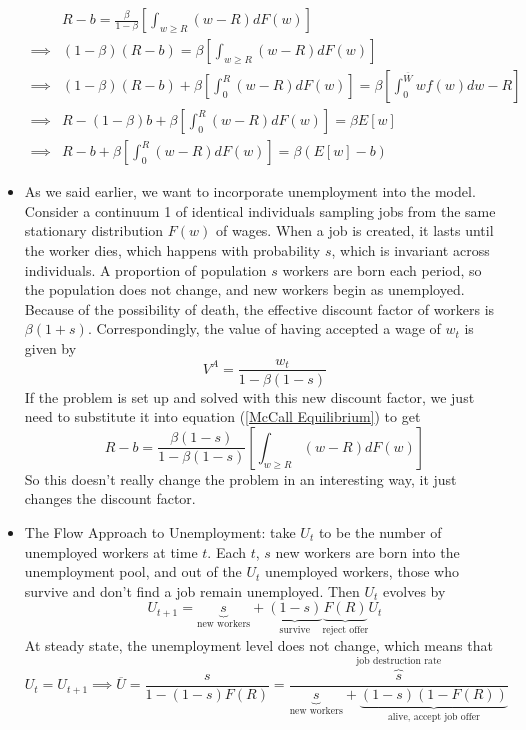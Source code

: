 \documentclass[12pt]{article}
\begin{document}
\begin{itemize}
\begin{equation}
        \begin{split}
        &R-b = \frac{\beta}{1-\beta}\left[\int_{w\geq R}(w-R)dF(w)\right] \\
        \implies &(1-\beta)(R-b) = \beta \left[\int_{w\geq R}(w-R)dF(w)\right] \\
        \implies &(1-\beta)(R-b) +\beta\left[\int_0^R(w-R)dF(w)\right] = \beta\left[ \int_0^{\overline{W}}wf(w)dw - R\right] \\
        \implies &R - (1-\beta)b +\beta\left[\int_0^R(w-R)dF(w)\right] = \beta E[w] \\
        \implies &R - b +\beta\left[\int_0^R(w-R)dF(w)\right] = \beta \left(E[w] - b\right)
    \end{split}
    \end{equation}
    \item As we said earlier, we want to incorporate unemployment into the model. Consider a continuum 1 of identical individuals sampling jobs from the same stationary distribution $F(w)$ of wages. When a job is created, it lasts until the worker dies, which happens with probability $s$, which is invariant across individuals. A proportion of population $s$ workers are born each period, so the population does not change, and new workers begin as unemployed. Because of the possibility of death, the effective discount factor of workers is $\beta(1+s)$. Correspondingly, the value of having accepted a wage of $w_t$ is given by
    \[V^A = \frac{w_t}{1 - \beta(1-s)}\]
    If the problem is set up and solved with this new discount factor, we just need to substitute it into equation (\ref{McCall Equilibrium}) to get
    \[R - b = \frac{\beta(1-s)}{1 - \beta(1-s)}\left[\int_{w\geq R}(w-R)dF(w)\right]\]
    So this doesn't really change the problem in an interesting way, it just changes the discount factor.
    \item The Flow Approach to Unemployment: take $U_t$ to be the number of unemployed workers at time $t$. Each $t$, $s$ new workers are born into the unemployment pool, and out of the $U_t$ unemployed workers, those who survive and don't find a job remain unemployed. Then $U_t$ evolves by
    \[U_{t+1} = \underbrace{s}_{\text{new workers}} + \underbrace{(1-s)}_{\text{survive}}\underbrace{F(R)}_{\text{reject offer}}U_t\]
    At steady state, the unemployment level does not change, which means that 
    \[U_t = U_{t+1} \implies \overline{U} = \frac{s}{1-(1-s)F(R)} = \frac{\overbrace{s}^{\text{job destruction rate}}}{\underbrace{s}_{\text{new workers}} + \underbrace{(1-s)(1-F(R))}_{\text{alive, accept job offer}}}\]

\end{itemize}
\end{document}
